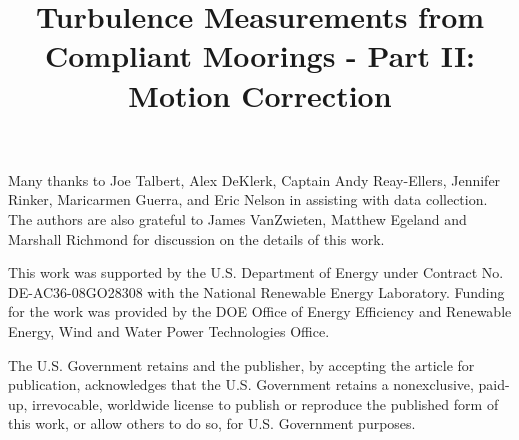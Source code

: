 \documentclass{ametsoc}
\title{Turbulence Measurements from Compliant Moorings - Part II: Motion Correction}
\affiliation{}
\begin{document}
\maketitle













\acknowledgments

Many thanks to Joe Talbert, Alex DeKlerk, Captain Andy Reay-Ellers,  Jennifer Rinker, Maricarmen Guerra, and Eric Nelson in assisting with data collection. The authors are also grateful to James VanZwieten, Matthew Egeland and Marshall Richmond for discussion on the details of this work.

This work was supported by the U.S. Department of Energy under Contract No. DE-AC36-08GO28308 with the National Renewable Energy Laboratory. Funding for the work was provided by the DOE Office of Energy Efficiency and Renewable Energy, Wind and Water Power Technologies Office. 

The U.S. Government retains and the publisher, by accepting the article for publication, acknowledges that the U.S. Government retains a nonexclusive, paid-up, irrevocable, worldwide license to publish or reproduce the published form of this work, or allow others to do so, for U.S. Government purposes.

\clearpage %

\appendix






\end{document}
